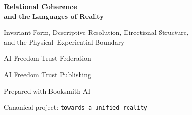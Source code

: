 \documentclass[11pt,oneside]{book}
\theoremstyle{definition}
\theoremstyle{remark}
\begin{document}
\pagestyle{plain}
\frontmatter

\begin{titlepage}
\centering
\vspace*{1.0in}
{\Huge\bfseries Relational Coherence\\and the Languages of Reality\par}
\vspace{0.28in}
{\Large Invariant Form, Descriptive Resolution, Directional Structure,\\and the Physical--Experiential Boundary\par}
\vspace{0.6in}
{\large AI Freedom Trust Federation\par}
\vfill
{\large AI Freedom Trust Publishing\par}
{\small Prepared with Booksmith AI\par}
{\small Canonical project: \texttt{towards-a-unified-reality}\par}
\end{titlepage}




\tableofcontents

\mainmatter














\appendix








\backmatter


\end{document}
